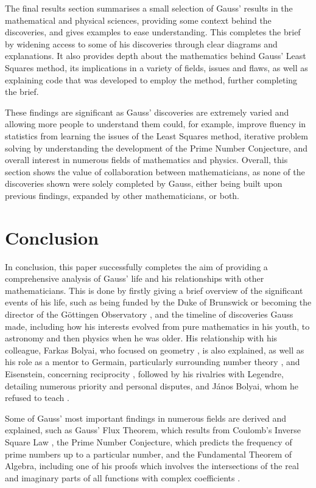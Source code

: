 \documentclass{article}
\begin{document}
The final results section summarises a small selection of Gauss' results in the mathematical and physical sciences, providing some context behind the discoveries, and gives examples to ease understanding. This completes the brief by widening access to some of his discoveries through clear diagrams and explanations. It also provides depth about the mathematics behind Gauss' Least Squares method, its implications in a variety of fields, issues and flaws, as well as explaining code that was developed to employ the method, further completing the brief.

These findings are significant as Gauss' discoveries are extremely varied and allowing more people to understand them could, for example, improve fluency in statistics from learning the issues of the Least Squares method, iterative problem solving by understanding the development of the Prime Number Conjecture, and overall interest in numerous fields of mathematics and physics. Overall, this section shows the value of collaboration between mathematicians, as none of the discoveries shown were solely completed by Gauss, either being built upon previous findings, expanded by other mathematicians, or both.




\section{Conclusion}

In conclusion, this paper successfully completes the aim of providing a comprehensive analysis of Gauss' life and his relationships with other mathematicians. This is done by firstly giving a brief overview of the significant events of his life, such as being funded by the Duke of Brunswick or becoming the director of the G\"{o}ttingen Observatory \cite{menofmaths}, and the timeline of discoveries Gauss made, including how his interests evolved from pure mathematics in his youth, to astronomy and then physics when he was older. His relationship with his colleague, Farkas Bolyai, who focused on geometry \cite{stigler}, is also explained, as well as his role as a mentor to Germain, particularly surrounding number theory \cite{germaincorrespondence}, and Eisenstein, concerning reciprocity \cite{schmitz}, followed by his rivalries with Legendre, detailing numerous priority and personal disputes, and János Bolyai, whom he refused to teach \cite{standrewsbolyai}.

Some of Gauss' most important findings in numerous fields are derived and explained, such as Gauss' Flux Theorem, which results from Coulomb's Inverse Square Law \cite{flux}, the Prime Number Conjecture, which predicts the frequency of prime numbers up to a particular number, and the Fundamental Theorem of Algebra, including one of his proofs which involves the intersections of the real and imaginary parts of all functions with complex coefficients \cite{fundamentaltheorem}. 
\end{document}
